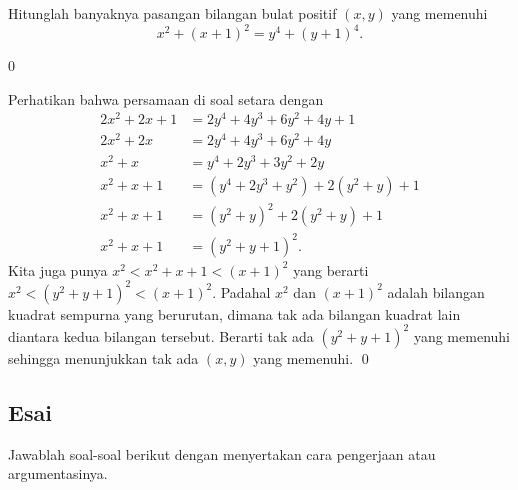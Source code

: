 \documentclass[11pt]{scrartcl}
\begin{document}
    \newpage
	\begin{soalbaru}
		Hitunglah banyaknya pasangan bilangan bulat positif $(x,y)$ yang memenuhi\\[-20pt] $$x^2+(x+1)^2=y^4+(y+1)^4.$$
		
		\begin{jawaban}
		0
		\end{jawaban}
		\begin{solusi}
		Perhatikan bahwa persamaan di soal setara dengan
		\begin{align*}
		2x^2+2x+1&=2y^4+4y^3+6y^2+4y+1\\
		2x^2+2x&=2y^4+4y^3+6y^2+4y\\
		x^2+x&=y^4+2y^3+3y^2+2y\\
		x^2+x+1&=(y^4+2y^3+y^2)+2(y^2+y)+1\\
		x^2+x+1&=(y^2+y)^2+2(y^2+y)+1\\
		x^2+x+1&=(y^2+y+1)^2.
		\end{align*}
		Kita juga punya $x^2 < x^2+x+1 < (x+1)^2$ yang berarti $x^2 < (y^2+y+1)^2 < (x+1)^2$. Padahal $x^2$ dan $(x+1)^2$ adalah bilangan kuadrat sempurna yang berurutan, dimana tak ada bilangan kuadrat lain diantara kedua bilangan tersebut. Berarti tak ada $(y^2+y+1)^2$ yang memenuhi sehingga menunjukkan tak ada $(x,y)$ yang memenuhi. \qed
		
		\end{solusi}
	\end{soalbaru}
	\newpage

\subsection{Esai}
Jawablah soal-soal berikut dengan menyertakan cara pengerjaan atau argumentasinya.
	
\end{document}
